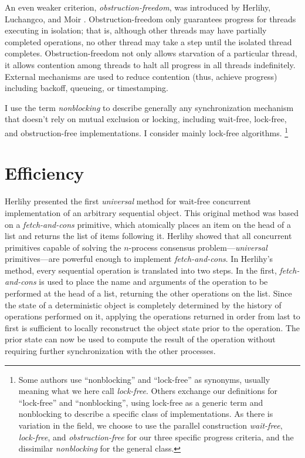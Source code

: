 An even weaker criterion, \emph{obstruction-freedom}, was introduced
by Herlihy, Luchangco, and Moir \cite{HerlihyLuMo03}.
Obstruction-freedom only guarantees progress for threads executing in
isolation; that is, although other threads may have partially
completed operations, no other thread may take a step until the
isolated thread completes.  Obstruction-freedom not only allows
starvation of a particular thread, it allows contention among threads
to halt all progress in all threads
indefinitely.  External mechanisms are used to reduce contention
(thus, achieve progress) including backoff, queueing, or timestamping.

I use the term \emph{nonblocking} to describe
generally any synchronization mechanism that doesn't rely on mutual
exclusion or locking, including wait-free, lock-free,
and obstruction-free implementations.
I consider mainly lock-free algorithms.%
\footnote{Some authors use ``nonblocking'' and
  ``lock-free'' as synonyms, usually meaning what we here call
  \emph{lock-free}.  Others exchange our definitions for ``lock-free''
  and ``nonblocking'', using lock-free as a generic term and nonblocking
  to describe a specific class of implementations.  As there is
  variation in the field, we choose to use the parallel construction
  \emph{wait-free}, \emph{lock-free}, and \emph{obstruction-free} for
  our three specific progress criteria, and the dissimilar
  \emph{nonblocking} for the general class.}

\section{Efficiency}\label{sec:efficiency}
Herlihy \cite{Herlihy88,Herlihy91}
presented the first \emph{universal} method for wait-free
concurrent implementation of an arbitrary sequential object.
This original method was based on
a \emph{fetch-and-cons} primitive, which atomically places
an item on the head of a list and returns the list of items following
it.  Herlihy showed that all concurrent primitives capable of solving the
$n$-process consensus problem---\emph{universal} primitives---are
powerful enough to implement \emph{fetch-and-cons}.
In Herlihy's method, 
every sequential operation is translated into two steps.  In the first,
\emph{fetch-and-cons} is used to place the name and arguments of the
operation to be performed
at the head of a list, returning the other operations on the list.
Since the state
of a deterministic object is completely determined by the history of
operations performed on it, applying the operations returned
in order from last to first is sufficient to locally reconstruct the
object state 
prior to the operation.
The prior state can now be used to compute the result of the operation
without requiring further synchronization with the other processes.

